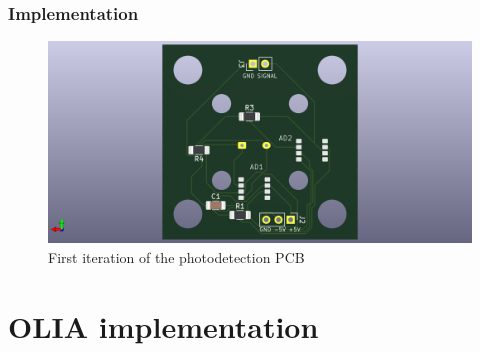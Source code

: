 \subsubsection{Implementation} 

\begin{figure}[ht]
	\centering
	\includegraphics[width=0.7\linewidth]{img/photodetec_og_pcb}
	\caption{First iteration of the photodetection PCB}
	\label{fig:photodetecogpcb}
\end{figure}


\section{OLIA implementation}
